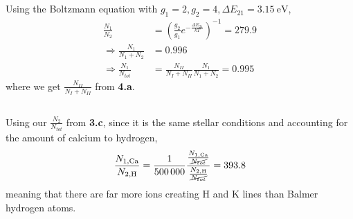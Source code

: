 \documentclass{article}
\begin{document}
\subsection{}

Using the Boltzmann equation with \(g_1 = 2, g_2 = 4, \Delta E_{21} = \SI{3.15}{\electronvolt}\),
\begin{align}
    \frac{N_1}{N_2} &= \left(\frac{g_2}{g_1} e^{-\frac{\Delta E_{21}}{kT}}\right)^{-1} = \num{279.9} \\
    \Rightarrow \frac{N_1}{N_1 + N_2} &= \num{0.996} \\
    \Rightarrow \frac{N_1}{N_{tot}} &= \frac{N_{II}}{N_I + N_{II}} \frac{N_1}{N_1 + N_2} = \num{0.995}
\end{align}
where we get \(\frac{N_{II}}{N_I + N_{II}}\) from \textbf{4.a}.

\subsection{}

Using our \(\frac{N_2}{N_{tot}}\) from \textbf{3.c}, since it is the same stellar conditions and accounting for the amount of calcium to hydrogen,
\begin{equation}
    \frac{N_{1, \ce{Ca}}}{N_{2, \ce{H}}} = \frac{1}{\num{500000}} \frac{\frac{N_{1, \ce{Ca}}}{\cancel{N_{tot}}}}{\frac{N_{2, \ce{H}}}{\cancel{N_{tot}}}} = \num{393.8}
\end{equation}
meaning that there are far more  ions creating H and K lines than Balmer hydrogen atoms.
\end{document}
